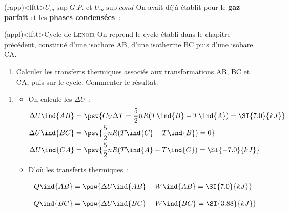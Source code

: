 \documentclass[../../main/main.tex]{subfiles}
\begin{document}
\begin{tcb}(rapp)<lftt>{$U_m\sup{G.P.}$ et $U_m\sup{cond}$}
	On avait déjà établit pour le \textbf{gaz parfait} et les \textbf{phases
		condensées}~:
	\psw{%
		\[
			U_m\sup{G.P.} = \frac{D}{2}nRT
			\qqet
			U_m\sup{cond} = U_m(T)
		\]
	}%
	\vspace{-15pt}
\end{tcb}

\begin{tcb}(appl)<lftt>{Cycle de \textsc{Lenoir}}
	On reprend le cycle établi dans le chapitre précédent, constitué d'une
	isochore AB, d'une isotherme BC puis d'une isobare CA.
	\begin{enumerate}[start=4, label=\sqenumi]
		\item Calculer les transferts thermiques associés aux transformations AB, BC
		      et CA, puis sur le cycle. Commenter le résultat.
	\end{enumerate}
	\tcblower
	\begin{enumerate}[start=4, label=\sqenumi]
		\item
		      \begin{isd}[sidebyside align=top]
			      \begin{itemize}
				      \item On calcule les $\Delta{U}$~:
				            \begin{align*}
					            \Delta{U}\ind{AB} & =
					            \psw{C_V\Delta{T} = \frac{5}{2}nR(T\ind{B} - T\ind{A}) = \SI{7.0}{kJ}}
					            \\
					            \Delta{U}\ind{BC} & =
					            \psw{\frac{5}{2}nR(T\ind{C} - T\ind{B}) = 0}
					            \\
					            \Delta{U}\ind{CA} & =
					            \psw{\frac{5}{2}nR(T\ind{A} - T\ind{C}) = \SI{-7.0}{kJ}}
				            \end{align*}
			      \end{itemize}
			      \tcblower
			      \begin{itemize}
				      \item D'où les transferts thermiques~:
				            \begin{align*}
					            Q\ind{AB} & = \psw{\Delta{U}\ind{AB} - W\ind{AB} = \SI{7.0}{kJ}}
					            \vphantom{\frac{5}{2}}
					            \\
					            Q\ind{BC} & = \psw{\Delta{U}\ind{BC} - W\ind{BC} = \SI{3.88}{kJ}}
					            \vphantom{\frac{5}{2}}
					            \\

\end{align*}
\end{itemize}
\end{isd}
\end{enumerate}
\end{tcb}
\end{document}
